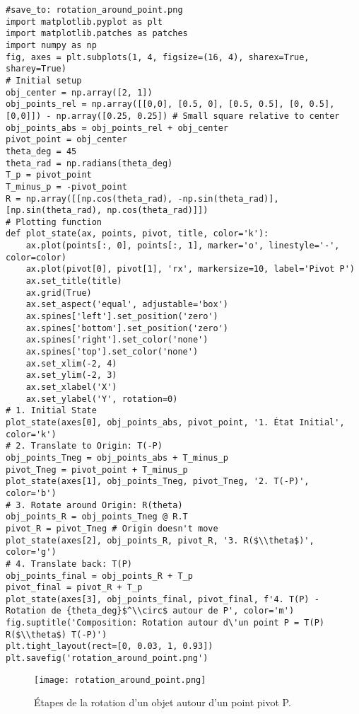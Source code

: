 \begin{verbatim}
#save_to: rotation_around_point.png
import matplotlib.pyplot as plt
import matplotlib.patches as patches
import numpy as np
fig, axes = plt.subplots(1, 4, figsize=(16, 4), sharex=True, sharey=True)
# Initial setup
obj_center = np.array([2, 1])
obj_points_rel = np.array([[0,0], [0.5, 0], [0.5, 0.5], [0, 0.5], [0,0]]) - np.array([0.25, 0.25]) # Small square relative to center
obj_points_abs = obj_points_rel + obj_center
pivot_point = obj_center
theta_deg = 45
theta_rad = np.radians(theta_deg)
T_p = pivot_point
T_minus_p = -pivot_point
R = np.array([[np.cos(theta_rad), -np.sin(theta_rad)], [np.sin(theta_rad), np.cos(theta_rad)]])
# Plotting function
def plot_state(ax, points, pivot, title, color='k'):
    ax.plot(points[:, 0], points[:, 1], marker='o', linestyle='-', color=color)
    ax.plot(pivot[0], pivot[1], 'rx', markersize=10, label='Pivot P')
    ax.set_title(title)
    ax.grid(True)
    ax.set_aspect('equal', adjustable='box')
    ax.spines['left'].set_position('zero')
    ax.spines['bottom'].set_position('zero')
    ax.spines['right'].set_color('none')
    ax.spines['top'].set_color('none')
    ax.set_xlim(-2, 4)
    ax.set_ylim(-2, 3)
    ax.set_xlabel('X')
    ax.set_ylabel('Y', rotation=0)
# 1. Initial State
plot_state(axes[0], obj_points_abs, pivot_point, '1. État Initial', color='k')
# 2. Translate to Origin: T(-P)
obj_points_Tneg = obj_points_abs + T_minus_p
pivot_Tneg = pivot_point + T_minus_p
plot_state(axes[1], obj_points_Tneg, pivot_Tneg, '2. T(-P)', color='b')
# 3. Rotate around Origin: R(theta)
obj_points_R = obj_points_Tneg @ R.T
pivot_R = pivot_Tneg # Origin doesn't move
plot_state(axes[2], obj_points_R, pivot_R, '3. R($\\theta$)', color='g')
# 4. Translate back: T(P)
obj_points_final = obj_points_R + T_p
pivot_final = pivot_R + T_p
plot_state(axes[3], obj_points_final, pivot_final, f'4. T(P) - Rotation de {theta_deg}$^\\circ$ autour de P', color='m')
fig.suptitle('Composition: Rotation autour d\'un point P = T(P) R($\\theta$) T(-P)')
plt.tight_layout(rect=[0, 0.03, 1, 0.93])
plt.savefig('rotation_around_point.png')
\end{verbatim}
\begin{figure}[H]
\centering
\texttt{[image: rotation\_around\_point.png]}
\caption{Étapes de la rotation d'un objet autour d'un point pivot P.}
\label{fig:rotation_around_point}
\end{figure}
